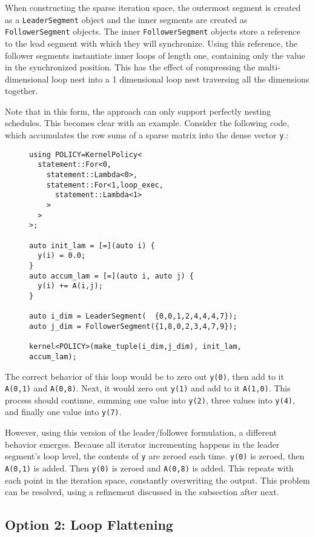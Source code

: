 When constructing the sparse iteration space, the outermost segment is created as a \verb.LeaderSegment. object and the inner segments are created as \verb.FollowerSegment. objects.
The inner \verb.FollowerSegment. objects store a reference to the lead segment with which they will synchronize.
Using this reference, the follower segments instantiate inner loops of length one, containing only the value in the synchronized position. 
This has the effect of compressing the multi-dimensional loop nest into a 1 dimensional loop nest traversing all the dimensions together.

Note that in this form, the approach can only support perfectly nesting schedules.
This becomes clear with an example.
Consider the following code, which accumulates the row sums of a sparse matrix into the dense vector \verb.y..:
\begin{figure}
\begin{lstlisting}
using POLICY=KernelPolicy<
  statement::For<0,
    statement::Lambda<0>,
    statement::For<1,loop_exec,
      statement::Lambda<1>
    >
  >
>;

auto init_lam = [=](auto i) {
  y(i) = 0.0;
}
auto accum_lam = [=](auto i, auto j) {
  y(i) += A(i,j);
}

auto i_dim = LeaderSegment(  {0,0,1,2,4,4,4,7});
auto j_dim = FollowerSegment({1,8,0,2,3,4,7,9});

kernel<POLICY>(make_tuple(i_dim,j_dim), init_lam, accum_lam);
\end{lstlisting}
\end{figure}
The correct behavior of this loop would be to zero out \verb.y(0)., then add to it \verb.A(0,1). and \verb.A(0,8)..
Next, it would zero out \verb.y(1). and add to it \verb.A(1,0)..
This process should continue, summing one value into \verb.y(2)., three values into \verb.y(4)., and finally one value into \verb.y(7)..

However, using this version of the leader/follower formulation, a different behavior emerges.
Because all iterator incrementing happens in the leader segment's loop level, the contents of \verb.y. are zeroed each time.
\verb.y(0). is zeroed, then \verb.A(0,1). is added.
Then \verb.y(0). is zeroed and \verb.A(0,8). is added.
This repeats with each point in the iteration space, constantly overwriting the output. 
This problem can be resolved, using a refinement discussed in the subsection after next.

\subsection{Option 2: Loop Flattening}

